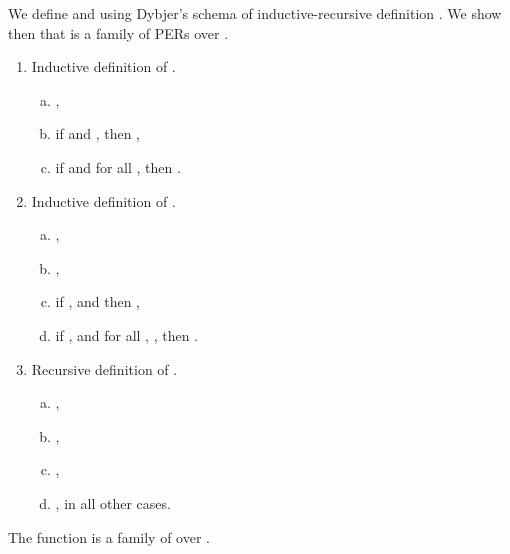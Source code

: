 \documentclass{LMCS}
\newcommand{\LONGVERSION}[1]{}
\newcommand{\SHORTVERSION}[1]{#1}
\newcommand{\LONGSHORT}[2]{\LONGVERSION{#1}\SHORTVERSION{#2}}
\begin{document}
We define  and  using Dybjer's schema of inductive-recursive definition 
\cite{dybjer:jsl00}. We show then that  is a family of PERs
over .

\begin{defi}\label{def:peru}\hfill
\begin{enumerate}[(1)]
\item Inductive definition of .\hfill
  \begin{enumerate}[(a)]
  \item ,
  \item if  and , then ,
  \item if  and for all ,  then .
  \end{enumerate}
\item Inductive definition of .\hfill
  \begin{enumerate}[(a)]
  \item ,
  \item ,
  \item if , and  then ,
  \item if , and for all , , then .
  \end{enumerate}
\item Recursive definition of .\hfill
  \begin{enumerate}[(a)]
  \item ,
  \item ,
  \item ,
  \item , in all other cases.
  \end{enumerate}
\end{enumerate}
\end{defi}


\LONGVERSION{
\begin{rem}
  \label{rem:ord-pert}
  The generation order  on  is well-founded. The
  minimal elements are , and elements in ; , and for all , ;
  and, finally, .
\end{rem}
}

\begin{lem}
  \label{lem:famperd}
\LONGSHORT{
  The function  is a family of
   over , i.e., .
}{
  The function  is a family of  over .  
}
\end{lem}

\LONGVERSION{
  \begin{proof} By induction on . 
See Appendix~\ref{prf:famperd}.
  \end{proof}

The previous lemma leads us to the definition of a PER model over
. Note also that  has all the distinguished elements needed to
call it a syntactical applicative structure.

\begin{cor}
  The tuple  is a PER model. \qed
\end{cor}
}
\newcommand{\etatitle}{\texorpdfstring{}{eta}}
\end{document}
